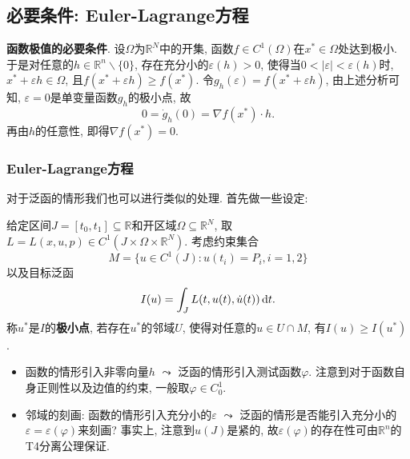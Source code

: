 \subsection{必要条件: Euler-Lagrange方程}

\textbf{函数极值的必要条件}. 设$\Omega$为$\mathbb{R}^N$中的开集, 函数$f \in C^1(\Omega)$在$x^* \in \Omega$处达到极小.
于是对任意的$h \in \mathbb{R}^n \smallsetminus \{0\}$, 存在充分小的$\varepsilon(h) > 0$, 使得当$0 < |\varepsilon| < \varepsilon(h)$时, $x^* + \varepsilon h \in \Omega$, 且$f(x^* + \varepsilon h) \geq f(x^*)$.
令$g_h(\varepsilon) = f(x^* + \varepsilon h)$, 由上述分析可知, $\varepsilon = 0$是单变量函数$g_h$的极小点, 故
\begin{equation*}
    0 = \dot g_h(0) = \nabla f(x^*) \cdot h.
\end{equation*}
再由$h$的任意性, 即得$\nabla f(x^*) = 0$.

\subsubsection{Euler-Lagrange方程}

对于泛函的情形我们也可以进行类似的处理. 首先做一些设定:

给定区间$J = [t_0, t_1] \subseteq \mathbb{R}$和开区域$\Omega \subseteq \mathbb{R}^N$, 取$L = L(x, u, p) \in C^1(J \times \Omega \times \mathbb{R}^N)$.
考虑约束集合 
\begin{equation*}
    M = \{u \in C^1(J)\colon u(t_i) = P_i, i = 1, 2\}
\end{equation*}
以及目标泛函 
\begin{equation*}
    I(u) =\int_JL(t, u(t), \dot{u}(t)) \,{\rm d}t.
\end{equation*}
称$u^*$是$I$的\textbf{极小点}, 若存在$u^*$的邻域$U$, 使得对任意的$u \in U \cap M$, 有$I(u) \geq I(u^*)$.
\begin{itemize}
    \item 函数的情形引入非零向量$h$ $\leadsto$ 泛函的情形引入测试函数$\varphi$.
    注意到对于函数自身正则性以及边值的约束, 一般取$\varphi \in C_0^1$.
    \item 邻域的刻画: 函数的情形引入充分小的$\varepsilon$ $\leadsto$ 泛函的情形是否能引入充分小的$\varepsilon = \varepsilon(\varphi)$来刻画?
    事实上, 注意到$u(J)$是紧的, 故$\varepsilon(\varphi)$的存在性可由$\mathbb{R}^n$的T4分离公理保证.
\end{itemize}


